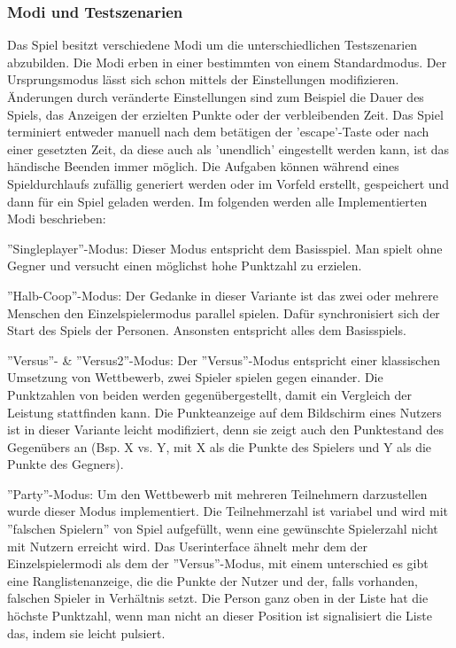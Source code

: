 \subsubsection{Modi und Testszenarien}
Das Spiel besitzt verschiedene Modi um die unterschiedlichen Testszenarien abzubilden. Die Modi erben in einer bestimmten von einem Standardmodus. Der Ursprungsmodus lässt sich schon mittels der Einstellungen modifizieren. Änderungen durch veränderte Einstellungen sind zum Beispiel die Dauer des Spiels, das Anzeigen der erzielten Punkte oder der verbleibenden Zeit. Das Spiel terminiert entweder manuell nach dem betätigen der 'escape'-Taste oder nach einer gesetzten Zeit, da diese auch als 'unendlich' eingestellt werden kann, ist das händische Beenden immer möglich. Die Aufgaben können während eines Spieldurchlaufs zufällig generiert werden oder im Vorfeld erstellt, gespeichert und dann für ein Spiel geladen werden. Im folgenden werden alle Implementierten Modi beschrieben:\itemize
\item''Singleplayer''-Modus:\newline
Dieser Modus entspricht dem Basisspiel. Man spielt ohne Gegner und versucht einen möglichst hohe Punktzahl zu erzielen.
\item''Halb-Coop''-Modus:\newline{}
Der Gedanke in dieser Variante ist das zwei oder mehrere Menschen den Einzelspielermodus parallel spielen. Dafür synchronisiert sich der Start des Spiels der Personen. Ansonsten entspricht alles dem Basisspiels.
\item''Versus''- \& ''Versus2''-Modus:\newline
Der ''Versus''-Modus entspricht einer klassischen Umsetzung von Wettbewerb, zwei Spieler spielen gegen einander. Die Punktzahlen von beiden werden gegenübergestellt, damit ein Vergleich der Leistung stattfinden kann. Die Punkteanzeige auf dem Bildschirm eines Nutzers ist in dieser Variante leicht modifiziert,  denn sie zeigt  auch den Punktestand des Gegenübers an (Bsp. X vs. Y, mit X als die Punkte des Spielers und Y als die Punkte des Gegners).
\item''Party''-Modus:\newline
Um den Wettbewerb mit mehreren Teilnehmern darzustellen wurde dieser Modus implementiert. Die Teilnehmerzahl ist variabel und wird mit ''falschen Spielern'' von Spiel aufgefüllt, wenn eine gewünschte Spielerzahl nicht mit Nutzern erreicht wird. Das Userinterface ähnelt mehr dem der Einzelspielermodi als dem der ''Versus''-Modus, mit einem unterschied es gibt eine Ranglistenanzeige, die die Punkte der Nutzer und der, falls vorhanden, falschen Spieler in Verhältnis setzt. Die Person ganz oben in der Liste hat die höchste Punktzahl, wenn man nicht an dieser Position ist signalisiert die Liste das, indem sie leicht pulsiert.
